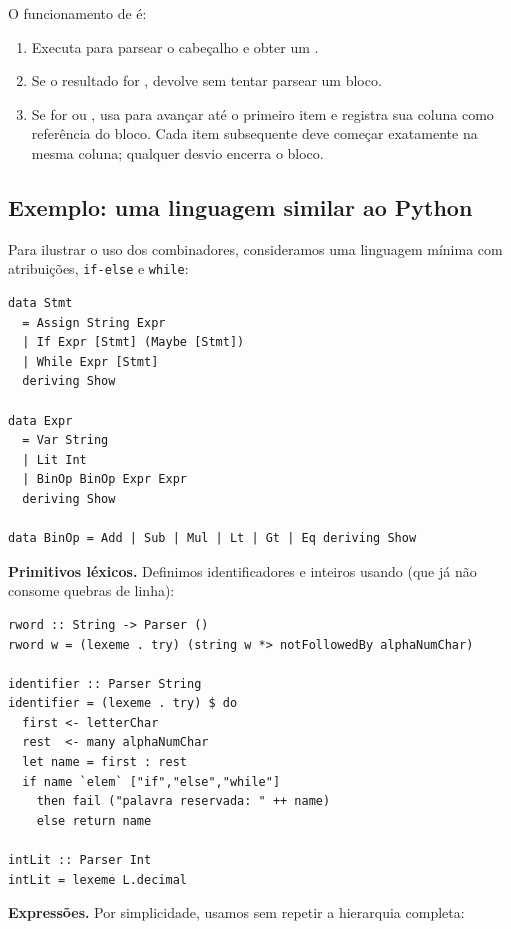O funcionamento de  é:
\begin{enumerate}
  \item Executa  para parsear o cabeçalho e obter um
    .
  \item Se o resultado for , devolve 
    sem tentar parsear um bloco.
  \item Se for  ou , usa
     para avançar até o primeiro item e registra sua
    coluna como referência do bloco. Cada item subsequente deve começar
    exatamente na mesma coluna; qualquer desvio encerra o bloco.
\end{enumerate}

\subsection{Exemplo: uma linguagem similar ao Python}

Para ilustrar o uso dos combinadores, consideramos uma linguagem
mínima com atribuições, \texttt{if-else} e \texttt{while}:

\begin{verbatim}
data Stmt
  = Assign String Expr
  | If Expr [Stmt] (Maybe [Stmt])
  | While Expr [Stmt]
  deriving Show

data Expr
  = Var String
  | Lit Int
  | BinOp BinOp Expr Expr
  deriving Show

data BinOp = Add | Sub | Mul | Lt | Gt | Eq deriving Show
\end{verbatim}

\textbf{Primitivos léxicos.} Definimos identificadores e inteiros
usando  (que já não consome quebras de linha):

\begin{verbatim}
rword :: String -> Parser ()
rword w = (lexeme . try) (string w *> notFollowedBy alphaNumChar)

identifier :: Parser String
identifier = (lexeme . try) $ do
  first <- letterChar
  rest  <- many alphaNumChar
  let name = first : rest
  if name `elem` ["if","else","while"]
    then fail ("palavra reservada: " ++ name)
    else return name

intLit :: Parser Int
intLit = lexeme L.decimal
\end{verbatim}

\textbf{Expressões.} Por simplicidade, usamos
 sem repetir a hierarquia completa:

